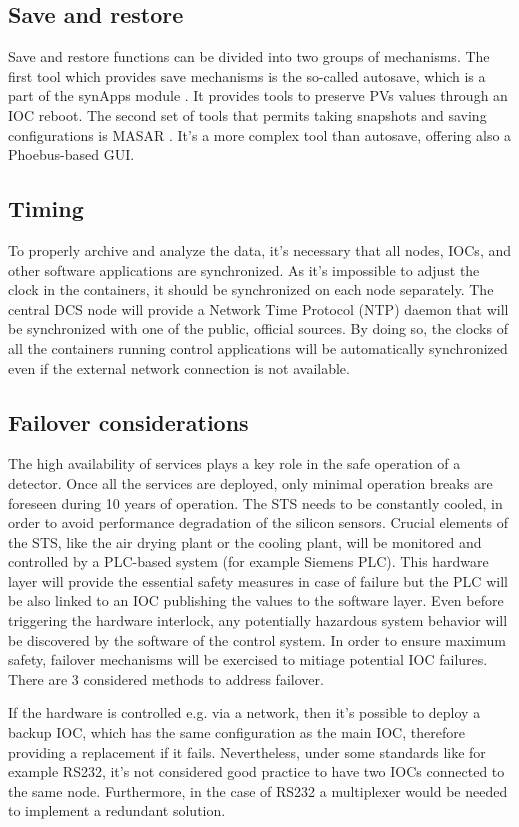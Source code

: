 \subsection{Save and restore}
Save and restore functions can be divided into two groups of mechanisms. The first tool which provides save mechanisms is the so-called autosave, which is a part of the synApps module \cite{autosave}. It provides tools to preserve PVs values through an IOC reboot. The second set of tools that permits taking snapshots and saving configurations is MASAR \cite{masar}. It's a more complex tool than autosave, offering also a Phoebus-based \gls{GUI}. 
\subsection{Timing}
To properly archive and analyze the data, it's necessary that all nodes, \glspl{IOC}, and other software applications are synchronized. As it's impossible to adjust the clock in the containers, it should be synchronized on each node separately. The central \gls{DCS} node will provide a Network Time Protocol (\gls{NTP}) daemon that will be synchronized with one of the public, official sources.  By doing so, the clocks of all the containers running control applications will be automatically synchronized even if the external network connection is not available. 
\subsection{Failover considerations}
The high availability of services plays a key role in the safe operation of a detector. Once all the services are deployed, only minimal operation breaks are foreseen during 10 years of operation. The STS needs to be constantly cooled, in order to avoid performance degradation of the silicon sensors.
Crucial elements of the STS, like the air drying plant or the cooling plant, will be monitored and controlled by a PLC-based system (for example Siemens PLC). This hardware layer will provide the essential safety measures in case of failure but the PLC will be also linked to an IOC publishing the values to the software layer. Even before triggering the hardware interlock, any potentially hazardous system behavior will be discovered by the software of the control system. In order to ensure maximum safety, failover mechanisms will be exercised to mitiage potential IOC failures. There are 3 considered methods to address failover. 


If the hardware is controlled e.g. via a network, then it's possible to deploy a backup IOC, which has the same configuration as the main IOC, therefore providing a replacement if it fails. Nevertheless, under some standards like for example RS232, it's not considered good practice to have two IOCs connected to the same node. Furthermore, in the case of RS232 a multiplexer would be needed to implement a redundant solution. 

